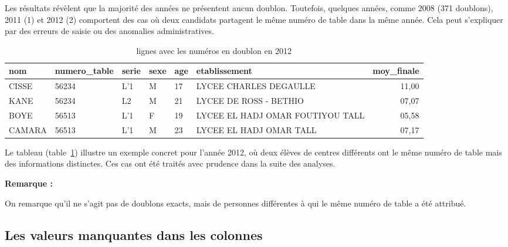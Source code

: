 Les résultats révèlent que la majorité des années ne présentent aucun doublon. Toutefois, quelques
années, comme 2008 (371 doublons), 2011 (1) et 2012 (2) comportent des cas où deux
candidats partagent le même numéro de table dans la même année. Cela peut s’expliquer par des
erreurs de saisie ou des anomalies administratives.

\begin{table}[h]
\scriptsize
\centering
\caption{lignes avec les numéros en doublon en 2012}
\label{tab:doublon}
\begin{tabular}{llllllr}
\toprule
nom & numero\_table & serie & sexe & age & etablissement & moy\_finale \\
\midrule
CISSE & 56234 & L'1 & M & 17 & LYCEE CHARLES DEGAULLE & 11,00 \\
KANE & 56234 & L2 & M & 21 & LYCEE DE ROSS - BETHIO & 07,07 \\
BOYE & 56513 & L'1 & F & 19 & LYCEE EL HADJ OMAR FOUTIYOU TALL & 05,58 \\
CAMARA & 56513 & L'1 & M & 23 & LYCEE EL HADJ OMAR TALL & 07,17 \\
\bottomrule
\end{tabular}
\end{table}

Le tableau (table~\ref{tab:doublon}) illustre un exemple concret pour l’année 2012, où deux élèves de centres différents ont le même numéro de table mais des informations distinctes. 
Ces cas ont été traités avec prudence dans la suite des analyses.

\textbf{Remarque :}

On remarque qu’il ne s’agit pas de doublons exacts, mais de personnes différentes à qui le même numéro de table a été attribué.

\newpage
\subsection{Les valeurs manquantes dans les colonnes}

